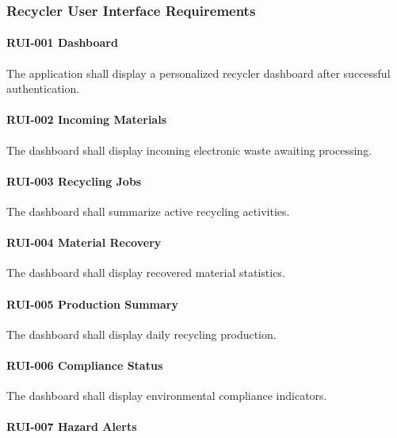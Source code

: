 
\subsubsection*{Recycler User Interface Requirements}

\paragraph{RUI-001 Dashboard}

The application shall display a personalized recycler dashboard after
successful authentication.

\paragraph{RUI-002 Incoming Materials}

The dashboard shall display incoming electronic waste awaiting
processing.

\paragraph{RUI-003 Recycling Jobs}

The dashboard shall summarize active recycling activities.

\paragraph{RUI-004 Material Recovery}

The dashboard shall display recovered material statistics.

\paragraph{RUI-005 Production Summary}

The dashboard shall display daily recycling production.

\paragraph{RUI-006 Compliance Status}

The dashboard shall display environmental compliance indicators.

\paragraph{RUI-007 Hazard Alerts}

